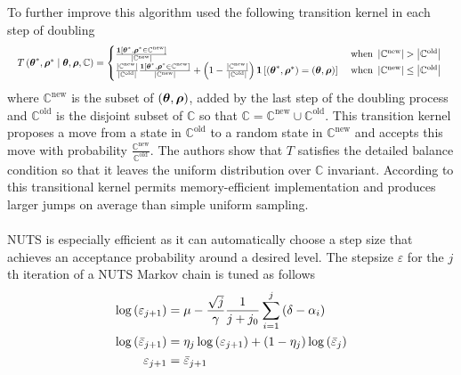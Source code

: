 \\
\\
To further improve this algorithm \cite{hoffman2011nouturn} used the following transition kernel in each step of doubling
\begin{equation*}
\resizebox{\textwidth}{!}{$
T\left(\boldsymbol{\theta}^{*}, \boldsymbol{\rho}^{*} \mid \boldsymbol{\theta},\boldsymbol{\rho}, \mathbb{C}\right)=\begin{cases} \frac{\mathbf{1}\left[\boldsymbol{\theta}^{*}, \boldsymbol{\rho}^{*} \in \mathbb{C}^{\text{new}}\right]}{\left|\mathbb{C}^{\text{new}}\right|} & \text{  when } \left|\mathbb{C}^{\text{new}}\right|>\left|\mathbb{C}^{\text{old}}\right|\\
\frac{\left|\mathbb{C}^{\text{new}}\right|}{\left|\mathbb{C}^{\text{old}}\right|} \frac{\mathbf{1}\left[\boldsymbol{\theta}^{*}, \boldsymbol{\rho}^{*} \in \mathbb{C}^{\text{new}}\right]}{\left|\mathbb{C}^{\text{new}}\right|}+\left(1-\frac{\left|\mathbb{C}^{\text{new}}\right|}{\left|\mathbb{C}^{\text{old}}\right|}\right) \mathbf{1}\left[\left(\boldsymbol{\theta}^{*}, \boldsymbol{\rho}^{*}\right)=(\boldsymbol{\theta}, \boldsymbol{\rho})\right] 
&\text{  when } \left|\mathbb{C}^{\text{new}}\right|\leq\left|\mathbb{C}^{\text{old}}\right|
\end{cases}$
}
\end{equation*}
where $\mathbb{C}^{\text{new}}$ is the subset of $\left (\boldsymbol{\theta}, \boldsymbol{\rho}\right)$, added by the last step of the doubling process and $\mathbb{C}^{\text{old}}$ is the disjoint subset of $\mathbb{C}$ so that $\mathbb{C} = \mathbb{C}^{\text{new}} \cup \mathbb{C}^{\text{old}}$. This transition kernel proposes a move from a state in $\mathbb{C}^{\text{old}}$ to a random state in $\mathbb{C}^{\text{new}}$ and accepts this move with probability $\frac{\mathbb{C}^{\text{new}}}{\mathbb{C}^{\text{old}}}$. The authors show that $T$ satisfies the detailed balance condition so that it leaves the uniform distribution over $\mathbb{C}$ invariant. According to \cite{nishio_arakawa_nouturn} this transitional kernel permits memory-efficient implementation and produces larger jumps on average than simple uniform sampling. 
\\
\\
NUTS is especially efficient as it can automatically choose a step size that achieves an acceptance probability around a desired level. The stepsize $\varepsilon$ for the $j$th iteration of a NUTS Markov chain is tuned as follows
\begin{equation*}
    \begin{split}
        \log\left (\varepsilon_{j+1}\right) &= \mu - \frac{\sqrt{j}}{\gamma} \frac{1}{j + j_0} \sum_{i=1}^j \left (\delta - \alpha_i\right)\\
        \log \left (\bar{\varepsilon}_{j+1}\right) &= \eta_j \log \left (\varepsilon_{j+1}\right) + \left (1 - \eta_j\right) \log \left (\bar{\varepsilon}_j\right) \\
        \varepsilon_{j+1} &= \bar{\varepsilon}_{j+1}
    \end{split}
\end{equation*}
